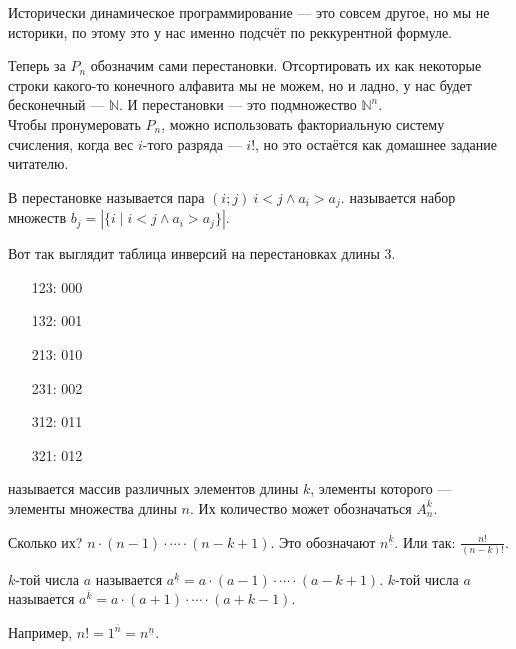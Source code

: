 \documentclass{article}
\begin{document}
\begin{itemize}
\begin{Comment}
            Исторически динамическое программирование --- это совсем другое, но мы не историки, по этому это у нас именно подсчёт по реккурентной формуле.
        \end{Comment}
        \begin{Comment}
            Теперь за $P_n$ обозначим сами перестановки. Отсортировать их как некоторые строки какого-то конечного алфавита мы не можем, но и ладно, у нас будет бесконечный --- $\mathbb N$. И перестановки --- это подмножество $\mathbb N^n$.\\
            Чтобы пронумеровать $P_n$, можно использовать факториальную систему счисления, когда вес $i$-того разряда --- $i!$, но это остаётся как домашнее задание читателю.
        \end{Comment}
        \dfn В перестановке  называется пара $(i;j)~i<j\land a_i>a_j$.
        \dfn {} называется набор множеств $b_j=|\{i\mid i<j\land a_i>a_j\}|$.
        \begin{Example}
            Вот так выглядит таблица инверсий на перестановках длины 3.
            \begin{enumerate}
                \item[123:] 000
                \item[132:] 001
                \item[213:] 010
                \item[231:] 002
                \item[312:] 011
                \item[321:] 012
            \end{enumerate}
        \end{Example}
        \dfn {} называется массив различных элементов длины $k$, элементы которого --- элементы множества длины $n$. Их количество может обозначаться $A_n^k$.
        \begin{Comment}
            Сколько их? $n\cdot(n-1)\cdot\cdots\cdot(n-k+1)$. Это обозначают $n^{\underline k}$. Или так: $\frac{n!}{(n-k)!}$.
        \end{Comment}
        \dfn $k$-той  числа $a$ называется $a^{\underline k}=a\cdot(a-1)\cdot\cdots\cdot(a-k+1)$.
        \dfn $k$-той  числа $a$ называется $a^{\overline k}=a\cdot(a+1)\cdot\cdots\cdot(a+k-1)$.
        \begin{Example}
            Например, $n!=1^{\overline n}=n^{\underline n}$.

\end{Example}
\end{itemize}
\end{document}
